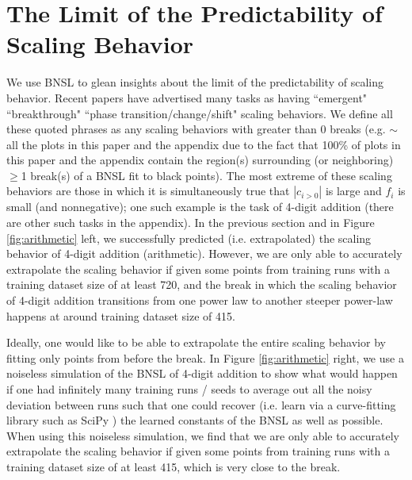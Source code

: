 \documentclass{article} %
\begin{document}
\section{The Limit of the Predictability of Scaling Behavior}
\label{section:limit_of_agi_superforecasting}
\vspace{-0.95mm}
We use BNSL to glean insights about the limit of the predictability of scaling behavior. Recent papers \citep{ganguli2022predictability, wei2022emergent, srivastava2022beyond} have advertised many tasks as having ``emergent" ``breakthrough" ``phase transition/change/shift"  scaling behaviors. We define all these quoted phrases as any scaling behaviors with greater than $0$ breaks (e.g. \(\sim \)all the plots in this paper and the appendix due to the fact that 100\% of plots in this paper and the appendix contain the region(s) surrounding (or neighboring) $\geq$1 break(s) of a BNSL fit to black points). The most extreme of these scaling behaviors are those in which it is simultaneously true that $|c_{i>0}|$ is large and $f_i$ is small (and nonnegative); one such example is the task of 4-digit addition (there are other such tasks in the appendix). In the previous section and in Figure \ref{fig:arithmetic} left, we successfully predicted (i.e. extrapolated) the scaling behavior of 4-digit addition (arithmetic). However, we are only able to accurately extrapolate the scaling behavior if given some points from training runs with a training dataset size of at least 720, and the break in which the scaling behavior of 4-digit addition transitions from one power law to another steeper power-law happens at around training dataset size of 415. 


Ideally, one would like to be able to extrapolate the entire scaling behavior by fitting only points from before the break. In Figure \ref{fig:arithmetic} right, we use a noiseless simulation of the BNSL of 4-digit addition to show what would happen if one had infinitely many training runs / seeds to average out all the noisy deviation between runs such that one could recover (i.e. learn via a curve-fitting library such as SciPy \citep{virtanen2020scipy}) the learned constants of the BNSL as well as possible. When using this noiseless simulation, we find that we are only able to accurately extrapolate the scaling behavior if given some points from training runs with a training dataset size of at least 415, which is very close to the break. 
\end{document}
